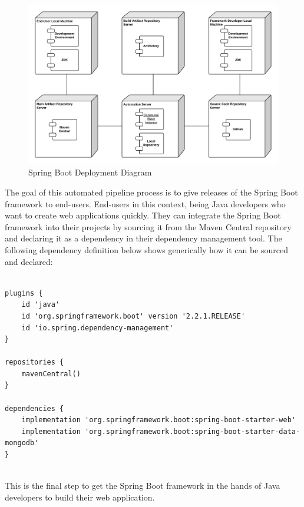 \begin{figure}[H]
    \centering
    \includegraphics[width=\textwidth]{content/architectural-views-top-level/deployment-diagram.png}
    \caption{Spring Boot Deployment Diagram}
    \label{deployment-diagram}
\end{figure}

The goal of this automated pipeline process is to give releases of the Spring Boot framework to end-users. End-users in this context, being Java developers who want to create web applications quickly. They can integrate the Spring Boot framework into their projects by sourcing it from the Maven Central repository and declaring it as a dependency in their dependency management tool. The following dependency definition below shows generically how it can be sourced and declared:\\

\clearpage

\begin{lstlisting}[caption=Representation of Dependency Management for Spring Boot]

plugins {
	id 'java'
    id 'org.springframework.boot' version '2.2.1.RELEASE'
	id 'io.spring.dependency-management'
}

repositories {
    mavenCentral()
}

dependencies {
    implementation 'org.springframework.boot:spring-boot-starter-web'
    implementation 'org.springframework.boot:spring-boot-starter-data-mongodb'
}
\end{lstlisting}\ \\

This is the final step to get the Spring Boot framework in the hands of Java developers to build their web application.